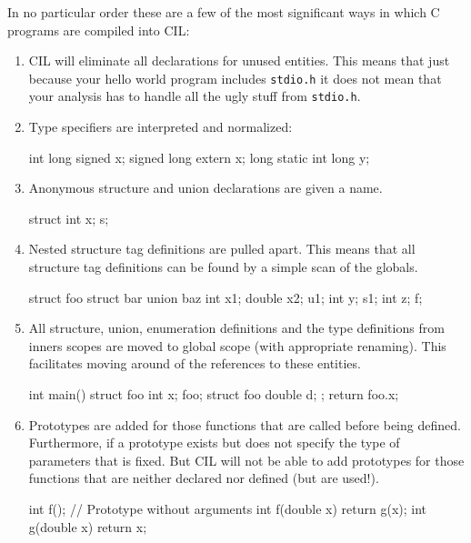 \documentclass{article}
\def\t#1{{\tt #1}}
\begin{document}
 In no particular order these are a few of the most significant ways in which
C programs are compiled into CIL:
\begin{enumerate}
\item CIL will eliminate all declarations for unused entities. This means that
just because your hello world program includes \t{stdio.h} it does not mean
that your analysis has to handle all the ugly stuff from \t{stdio.h}.

\item Type specifiers are interpreted and normalized:
\begin{cilcode}[global]
int long signed x;
signed long extern x;
long static int long y;
\end{cilcode}

\item Anonymous structure and union declarations are given a name. 
\begin{cilcode}[global]
 struct { int x; } s;
\end{cilcode}

\item Nested structure tag definitions are pulled apart. This means that all
structure tag definitions can be found by a simple scan of the globals.

\begin{cilcode}[global]
struct foo {
   struct bar {
      union baz { 
          int x1; 
          double x2;
      } u1;
      int y;
   } s1;
   int z;
} f;
\end{cilcode}

\item All structure, union, enumeration definitions and the type definitions
from inners scopes are moved to global scope (with appropriate renaming). This
facilitates moving around of the references to these entities.

\begin{cilcode}[global]
int main() {
  struct foo { 
        int x; } foo; 
  {
     struct foo { 
        double d;
     };
     return foo.x;
  }      
}
\end{cilcode}

\item Prototypes are added for those functions that are called before being
defined. Furthermore, if a prototype exists but does not specify the type of
parameters that is fixed. But CIL will not be able to add prototypes for those
functions that are neither declared nor defined (but are used!).
\begin{cilcode}[global]
  int f();  // Prototype without arguments
  int f(double x) {
      return g(x);
  }
  int g(double x) {
     return x;
  } 
\end{cilcode}


\end{enumerate}
\end{document}
